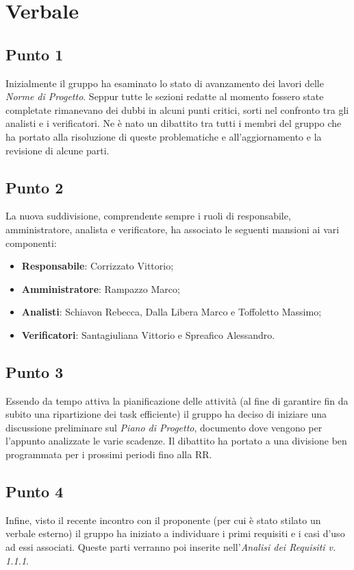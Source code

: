\section{Verbale}
    \subsection{Punto 1}
        Inizialmente il gruppo ha esaminato lo stato di avanzamento dei lavori delle \textit{Norme di Progetto}. Seppur tutte le sezioni redatte al momento fossero state completate rimanevano dei dubbi in alcuni punti critici, sorti nel confronto tra gli analisti e i verificatori. Ne è nato un dibattito tra tutti i membri del gruppo che ha portato alla risoluzione di queste problematiche e all'aggiornamento e la revisione di alcune parti. 
    \subsection{Punto 2}
        La nuova suddivisione, comprendente sempre i ruoli di responsabile, amministratore, analista e verificatore, ha associato le seguenti mansioni ai vari componenti:
        \begin{itemize}
            \item \textbf{Responsabile}: Corrizzato Vittorio;
            \item \textbf{Amministratore}: Rampazzo Marco;
            \item \textbf{Analisti}: Schiavon Rebecca, Dalla Libera Marco e Toffoletto Massimo;
            \item \textbf{Verificatori}: Santagiuliana Vittorio e Spreafico Alessandro.
        \end{itemize}
    \subsection{Punto 3}
        Essendo da tempo attiva la pianificazione delle attività (al fine di garantire fin da subito una ripartizione dei task efficiente) il gruppo ha deciso di iniziare una discussione preliminare sul \textit{Piano di Progetto}, documento dove vengono per l'appunto analizzate le varie scadenze. Il dibattito ha portato a una divisione ben programmata per i prossimi periodi fino alla RR.
    \subsection{Punto 4}
        Infine, visto il recente incontro con il proponente (per cui è stato stilato un verbale esterno) il gruppo ha iniziato a individuare i primi requisiti e i casi d'uso ad essi associati. Queste parti verranno poi inserite nell'\textit{Analisi dei Requisiti v. 1.1.1}.
